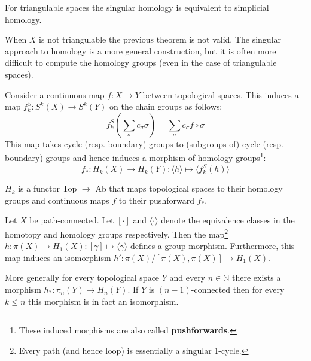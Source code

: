 	
	\begin{theorem}
		For triangulable spaces the singular homology is equivalent to simplicial homology.
	\end{theorem}
	\begin{remark}
		When $X$ is not triangulable the previous theorem is not valid. The singular approach to homology is a more general construction, but it is often more difficult to compute the homology groups (even in the case of triangulable spaces).
	\end{remark}
	
	\begin{property}
		Consider a continuous map $f:X\rightarrow Y$ between topological spaces. This induces a map $f_k^S:S^k(X)\rightarrow S^k(Y)$ on the chain groups as follows:
		\begin{equation}
			f_k^S\left(\sum_\sigma c_\sigma\sigma\right) = \sum_\sigma c_\sigma f\circ\sigma
		\end{equation}
		This map takes cycle (resp. boundary) groups to (subgroups of) cycle (resp. boundary) groups and hence induces a morphism of homology groups\footnote{These induced morphisms are also called \textbf{pushforwards}.}:
		\begin{equation}
			f_\ast:H_k(X)\rightarrow H_k(Y):\langle h \rangle\mapsto \langle f_k^S(h) \rangle
		\end{equation}
	\end{property}
	\begin{result}
		$H_k$ is a functor Top $\rightarrow$ Ab that maps topological spaces to their homology groups and continuous maps $f$ to their pushforward $f_\ast$.
	\end{result}
	
	\begin{theorem}[Hurewicz]
		Let $X$ be path-connected. Let $[\cdot]$ and $\langle\cdot\rangle$ denote the equivalence classes in the homotopy and homology groups respectively. Then the map\footnote{Every path (and hence loop) is essentially a singular 1-cycle.} $h:\pi(X)\rightarrow H_1(X):[\gamma]\mapsto\langle\gamma\rangle$ defines a group morphism. Furthermore, this map induces an isomorphism $h':\pi(X)/[\pi(X), \pi(X)]\rightarrow H_1(X)$.
		
		More generally for every topological space $Y$ and every $n\in\mathbb{N}$ there exists a morphism $h_*:\pi_n(Y)\rightarrow H_n(Y)$. If $Y$ is $(n-1)$-connected then for every $k\leq n$ this morphism is in fact an isomorphism.
	\end{theorem}
	

